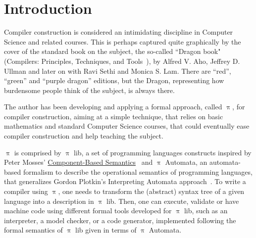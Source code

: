 \documentclass[a4paper,openany]{book}
\begin{document}
\chapter{Introduction}\label{sec:intro}

Compiler construction is considered an intimidating discipline in Computer Science and related courses. This is perhaps captured quite graphically by the cover of the standard book on the subject, the so-called ``Dragon book" (Compilers: Principles, Techniques, and Tools~\cite{Aho:2006:CPT:1177220}), by Alfred V. Aho, Jeffrey D. Ullman and later on with Ravi Sethi and Monica S. Lam. There are ``red'', ``green'' and ``purple dragon'' editions, but the Dragon, representing how burdensome people think of the subject, is always there. 

The author has been developing and applying a formal approach, called \href{http://github.com/ChristianoBraga/BPLC}{$\uppi$}, for compiler construction, aiming at a simple technique, that relies on basic mathematics and standard Computer Science courses, that could eventually ease compiler construction and help teaching the subject. 


$\uppi$ is comprised by $\uppi$ lib, a set of programming languages constructs inspired by Peter Mosses' \href{https://plancomps.github.io/CBS-beta}{Component-Based Semantics}~\cite{Mosses:2008:CDP:2227536.2227559} and $\uppi$ Automata, an au\-to\-mata-based formalism to describe the operational semantics of programming languages, that generalizes Gordon Plotkin's Interpreting Automata approach~\cite{plotkin}.   
To write a compiler using $\uppi$, one needs to transform the (abstract) syntax tree of a given language into a description in $\uppi$ lib. Then, one can execute, validate or have machine code using different formal tools developed for $\uppi$ lib, such as an interpreter, a model checker, or a code generator, implemented following the formal semantics of $\uppi$ lib given in terms of $\uppi$ Automata. 
\end{document}
